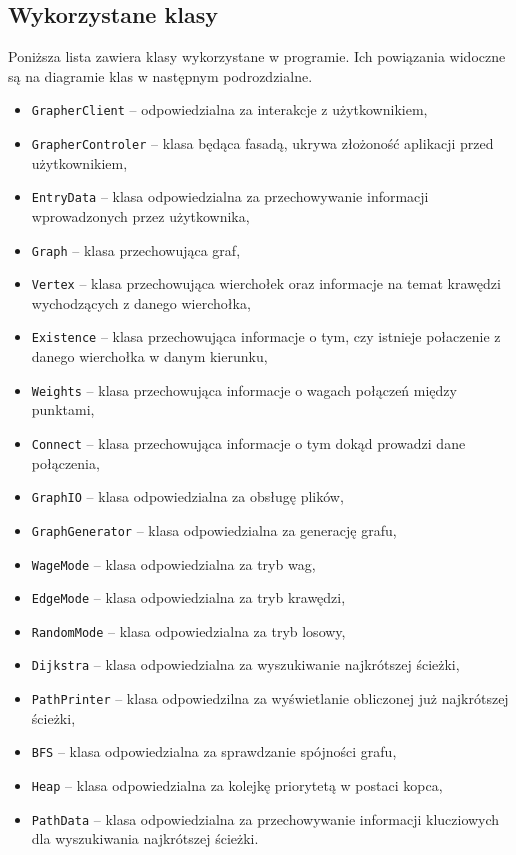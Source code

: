 \documentclass[10pt, a4paper]{report}
\begin{document}
    \subsection{Wykorzystane klasy}
    Poniższa lista zawiera klasy wykorzystane w programie. Ich powiązania widoczne są na diagramie klas w następnym podrozdzialne.

    \begin{itemize}
      \item \texttt{GrapherClient} -- odpowiedzialna za interakcje z użytkownikiem,
      \item \texttt{GrapherControler} -- klasa będąca fasadą, ukrywa złożoność aplikacji przed użytkownikiem,
      \item \texttt{EntryData} -- klasa odpowiedzialna za przechowywanie informacji wprowadzonych przez użytkownika,
      \item \texttt{Graph} -- klasa przechowująca graf,
      \item \texttt{Vertex} -- klasa przechowująca wierchołek oraz informacje na temat krawędzi wychodzących z danego wierchołka,
      \item \texttt{Existence} -- klasa przechowująca informacje o tym, czy istnieje połaczenie z danego wierchołka w danym kierunku,
      \item \texttt{Weights} -- klasa przechowująca informacje o wagach połączeń między punktami,
      \item \texttt{Connect} -- klasa przechowująca informacje o tym dokąd prowadzi dane połączenia,
      \item \texttt{GraphIO} -- klasa odpowiedzialna za obsługę plików,
      \item \texttt{GraphGenerator} -- klasa odpowiedzialna za generację grafu,
      \item \texttt{WageMode} -- klasa odpowiedzialna za tryb wag,
      \item \texttt{EdgeMode} -- klasa odpowiedzialna za tryb krawędzi,
      \item \texttt{RandomMode} -- klasa odpowiedzialna za tryb losowy,
      \item \texttt{Dijkstra} -- klasa odpowiedzialna za wyszukiwanie najkrótszej ścieżki,
      \item \texttt{PathPrinter} -- klasa odpowiedzilna za wyświetlanie obliczonej już najkrótszej ścieżki,
      \item \texttt{BFS} -- klasa odpowiedzialna za sprawdzanie spójności grafu,
      \item \texttt{Heap} -- klasa odpowiedzialna za kolejkę priorytetą w postaci kopca,
      \item \texttt{PathData} -- klasa odpowiedzialna za przechowywanie informacji klucziowych dla wyszukiwania najkrótszej ścieżki.
    \end{itemize}
    \newpage
\end{document}
